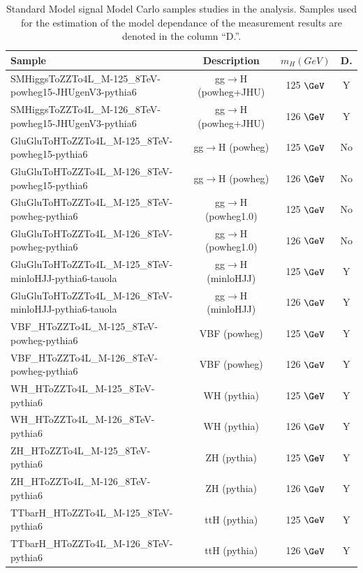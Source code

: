 \begin{table}[!h!tb]
\begin{center}
\small
\caption{
Standard Model signal Model Carlo samples studies in the analysis.
Samples used for the estimation of the model dependance of the measurement results are denoted in the column ``D.''.
\label{tab:samplesSM}
}
\begin{tabular}{|l|c|c|c|} \hline
Sample & Description & $m_{H} (GeV)$ & D. \\ \hline
SMHiggsToZZTo4L\_M-125\_8TeV-powheg15-JHUgenV3-pythia6 & gg$\rightarrow$H ({\sc powheg+JHU}) & 125 $\GeV$ & Y \\
 SMHiggsToZZTo4L\_M-126\_8TeV-powheg15-JHUgenV3-pythia6 & gg$\rightarrow$H ({\sc powheg+JHU})& 126 $\GeV$ & Y \\
 GluGluToHToZZTo4L\_M-125\_8TeV-powheg15-pythia6 & gg$\rightarrow$H ({\sc powheg}) & 125 $\GeV$ & No \\
 GluGluToHToZZTo4L\_M-126\_8TeV-powheg15-pythia6 & gg$\rightarrow$H ({\sc powheg}) & 126 $\GeV$ & No \\
 GluGluToHToZZTo4L\_M-125\_8TeV-powheg-pythia6 & gg$\rightarrow$H ({\sc powheg1.0}) & 125 $\GeV$ & No \\
 GluGluToHToZZTo4L\_M-126\_8TeV-powheg-pythia6 & gg$\rightarrow$H ({\sc powheg1.0}) & 126 $\GeV$ & No \\
 GluGluToHToZZTo4L\_M-125\_8TeV-minloHJJ-pythia6-tauola & gg$\rightarrow$H ({\sc minloHJJ}) & 125 $\GeV$ & Y\\
 GluGluToHToZZTo4L\_M-126\_8TeV-minloHJJ-pythia6-tauola & gg$\rightarrow$H ({\sc minloHJJ}) & 126 $\GeV$ & Y\\
 VBF\_HToZZTo4L\_M-125\_8TeV-powheg-pythia6 & VBF ({\sc powheg}) & 125 $\GeV$ & Y \\
 VBF\_HToZZTo4L\_M-126\_8TeV-powheg-pythia6 & VBF ({\sc powheg}) & 126 $\GeV$ & Y \\
 WH\_HToZZTo4L\_M-125\_8TeV-pythia6 & WH ({\sc pythia}) & 125 $\GeV$ & Y \\
 WH\_HToZZTo4L\_M-126\_8TeV-pythia6 & WH ({\sc pythia}) & 126 $\GeV$ & Y \\
 ZH\_HToZZTo4L\_M-125\_8TeV-pythia6 & ZH ({\sc pythia}) & 125 $\GeV$ & Y \\
 ZH\_HToZZTo4L\_M-126\_8TeV-pythia6 & ZH ({\sc pythia}) & 126 $\GeV$ & Y \\
 TTbarH\_HToZZTo4L\_M-125\_8TeV-pythia6 & ttH ({\sc pythia})& 125 $\GeV$ & Y \\
 TTbarH\_HToZZTo4L\_M-126\_8TeV-pythia6 & ttH ({\sc pythia})& 126 $\GeV$ & Y \\
\hline
\end{tabular}
\normalsize
\end{center}
\end{table}
